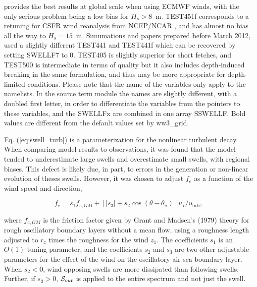 \begin{table}
{provides the best results at global scale when using ECMWF winds, with the
only serious problem being a low bias for $H_s > 8$~m.  TEST451f corresponds
to a retuning for CSFR wind reanalysis from NCEP/NCAR \citep{art:CFSRR10}, and
has almost no bias all the way to $H_s = 15$~m. Simumations and papers
prepared before March 2012, used a slightly different TEST441 and TEST441f
which can be recovered by setting SWELLF7 to 0.  TEST405 is slightly superior
for short fetches, and TEST500 is intermediate in terms of quality but it also
includes depth-induced breaking in the same formulation, and thus may be more
appropriate for depth-limited conditions.  Please note that the name of the
variables only apply to the namelists. In the source term module the names are
slightly different, with a doubled first letter, in order to differentiate the
variables from the pointers to these variables, and the SWELLFx are combined
in one array SSWELLF. Bold values are different from the default values set by
ww3\_grid.} \label{tab:ST4_parSIN}
\end{table}


Eq. (\ref{eq:swell_turb}) is a parameterization for the
nonlinear turbulent decay. When comparing model results to observations, it
was found that the model tended to underestimate large swells and overestimate
small swells, with regional biases. This defect is likely due, in part, to
errors in the generation or non-linear evolution of theses swells. However, it
was chosen to adjust $f_e$ as a function of the wind speed and direction,

\begin{equation}
f_e = s_1 f_{e,GM} + \left[\left|s_3\right| + s_2 \cos
(\theta-\theta_u)\right]u_\star / u_{\mathrm{orb}},\label{fevar}
\end{equation}

\noindent 
where $f_{e,GM}$ is the friction factor given by Grant and Madsen's
(1979)\nocite{art:GM79} theory for rough oscillatory boundary layers without a
mean flow, using a roughness length adjusted to $r_z$ times the roughness for
the wind $z_1$. The coefficients $s_1$ is an $O(1)$ tuning parameter, and the
coefficients $s_2$ and $s_3$ are two other adjustable parameters for the
effect of the wind on the oscillatory air-sea boundary layer. When $s_2 < 0$,
wind opposing swells are more dissipated than following swells. Further, if
$s_3 > 0$, ${\cal S}_{out}$ is applied to the entire spectrum and not just the
swell.

